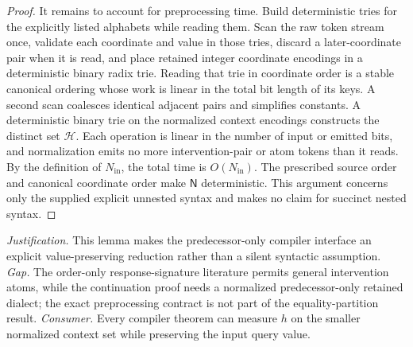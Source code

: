 \documentclass{article}
\begin{document}
\begin{proof}
It remains to account for preprocessing time. Build deterministic tries for the explicitly listed alphabets while reading them. Scan the raw token stream once, validate each coordinate and value in those tries, discard a later-coordinate pair when it is read, and place retained integer coordinate encodings in a deterministic binary radix trie. Reading that trie in coordinate order is a stable canonical ordering whose work is linear in the total bit length of its keys. A second scan coalesces identical adjacent pairs and simplifies constants. A deterministic binary trie on the normalized context encodings constructs the distinct set \(\mathcal H\). Each operation is linear in the number of input or emitted bits, and normalization emits no more intervention-pair or atom tokens than it reads. By the definition of \(N_{\mathrm{in}}\), the total time is \(O(N_{\mathrm{in}})\). The prescribed source order and canonical coordinate order make \(\mathsf N\) deterministic. This argument concerns only the supplied explicit unnested syntax and makes no claim for succinct nested syntax.
\end{proof}
\par\smallskip\noindent \textit{Justification.} This lemma makes the predecessor-only compiler interface an explicit value-preserving reduction rather than a silent syntactic assumption. \textit{Gap.} The order-only response-signature literature permits general intervention atoms, while the continuation proof needs a normalized predecessor-only retained dialect; the exact preprocessing contract is not part of the equality-partition result. \textit{Consumer.} Every compiler theorem can measure \(h\) on the smaller normalized context set while preserving the input query value.
\end{document}
